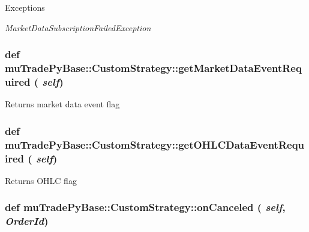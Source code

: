 \begin{DoxyExceptions}{Exceptions}
\item[{\em MarketDataSubscriptionFailedException}]\end{DoxyExceptions}
\hypertarget{classmuTradePyBase_1_1CustomStrategy_aaed973e7d7ddba726cde0eccd20cca27}{
\subsubsection[{getMarketDataEventRequired}]{\setlength{\rightskip}{0pt plus 5cm}def muTradePyBase::CustomStrategy::getMarketDataEventRequired ( {\em self})}}
\label{classmuTradePyBase_1_1CustomStrategy_aaed973e7d7ddba726cde0eccd20cca27}
\begin{DoxyReturn}{Returns}
market data event flag 
\end{DoxyReturn}
\hypertarget{classmuTradePyBase_1_1CustomStrategy_a67150cfa4a93fd0e33cfdb515264985c}{
\subsubsection[{getOHLCDataEventRequired}]{\setlength{\rightskip}{0pt plus 5cm}def muTradePyBase::CustomStrategy::getOHLCDataEventRequired ( {\em self})}}
\label{classmuTradePyBase_1_1CustomStrategy_a67150cfa4a93fd0e33cfdb515264985c}
\begin{DoxyReturn}{Returns}
OHLC flag 
\end{DoxyReturn}
\hypertarget{classmuTradePyBase_1_1CustomStrategy_ad17943f78d2a1a38716e94067eba0804}{
\subsubsection[{onCanceled}]{\setlength{\rightskip}{0pt plus 5cm}def muTradePyBase::CustomStrategy::onCanceled ( {\em self}, \/   {\em OrderId})}}
\label{classmuTradePyBase_1_1CustomStrategy_ad17943f78d2a1a38716e94067eba0804}


